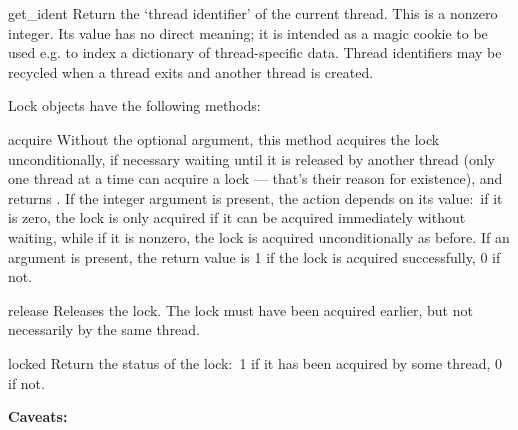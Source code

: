 \begin{funcdesc}{get_ident}{}
Return the `thread identifier' of the current thread.  This is a
nonzero integer.  Its value has no direct meaning; it is intended as a
magic cookie to be used e.g. to index a dictionary of thread-specific
data.  Thread identifiers may be recycled when a thread exits and
another thread is created.
\end{funcdesc}

Lock objects have the following methods:

\renewcommand{\indexsubitem}{(lock method)}
\begin{funcdesc}{acquire}{}
Without the optional argument, this method acquires the lock
unconditionally, if necessary waiting until it is released by another
thread (only one thread at a time can acquire a lock --- that's their
reason for existence), and returns .  If the integer
 argument is present, the action depends on its value:\
if it is zero, the lock is only acquired if it can be acquired
immediately without waiting, while if it is nonzero, the lock is
acquired unconditionally as before.  If an argument is present, the
return value is 1 if the lock is acquired successfully, 0 if not.
\end{funcdesc}

\begin{funcdesc}{release}{}
Releases the lock.  The lock must have been acquired earlier, but not
necessarily by the same thread.
\end{funcdesc}

\begin{funcdesc}{locked}{}
Return the status of the lock:\ 1 if it has been acquired by some
thread, 0 if not.
\end{funcdesc}

{\bf Caveats:}

